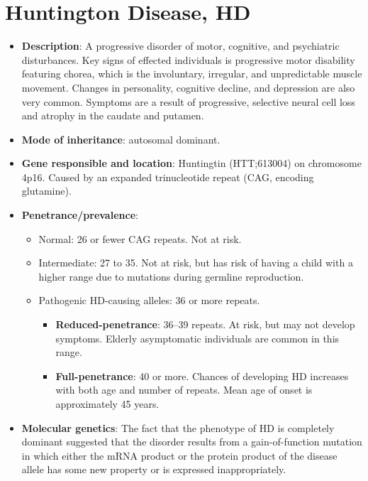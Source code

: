 \documentclass[plain,basic]{inVerba-notes}
\begin{document}
\section*{Huntington Disease, HD} 

\begin{itemize}
    \item \textbf{Description}: A progressive disorder of motor, cognitive, and psychiatric disturbances. Key signs of effected individuals is progressive motor disability featuring chorea, which is the involuntary, irregular, and unpredictable muscle movement. Changes in personality, cognitive decline, and depression are also very common. Symptoms are a result of progressive, selective neural cell loss and atrophy in the caudate and putamen. 
    \item \textbf{Mode of inheritance}: autosomal dominant.
    \item \textbf{Gene responsible and location}: Huntingtin (HTT;\@ 613004) on chromosome 4p16. Caused by an expanded trinucleotide repeat (CAG, encoding glutamine). 
    \item \textbf{Penetrance/prevalence}:
        \begin{itemize}
            \item Normal: 26 or fewer CAG repeats. Not at risk.
            \item Intermediate: 27 to 35. Not at risk, but has risk of having a child with a higher range due to mutations during germline reproduction.
            \item Pathogenic HD-causing alleles: 36 or more repeats. 
                \begin{itemize}
                    \item \textbf{Reduced-penetrance}: 36--39 repeats. At risk, but may not develop symptoms. Elderly asymptomatic individuals are common in this range.
                    \item \textbf{Full-penetrance}: 40 or more. Chances of developing HD increases with both age and number of repeats. Mean age of onset is approximately 45 years.
                \end{itemize}
        \end{itemize}
    \item \textbf{Molecular genetics}: The fact that the phenotype of HD is completely dominant suggested that the disorder results from a gain-of-function mutation in which either the mRNA product or the protein product of the disease allele has some new property or is expressed inappropriately.~

\end{itemize}
\end{document}
